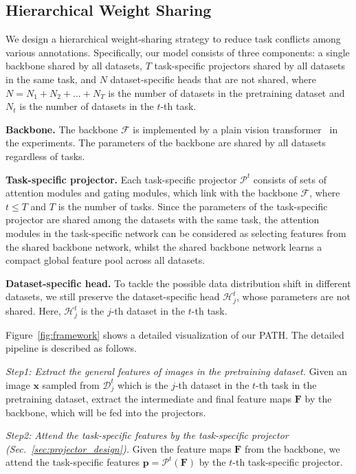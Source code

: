 \documentclass[10pt,twocolumn,letterpaper]{article}
\begin{document}
\subsection{Hierarchical Weight Sharing} \label{sec:hierarchical_weight_sharing}
We design a hierarchical weight-sharing strategy to reduce task conflicts among various annotations. Specifically, our model consists of three components: a single backbone shared by all datasets, $T$ task-specific projectors shared by all datasets in the same task, and $N$ dataset-specific heads that are not shared, where $N=N_1\!+\!N_2\!+\!...\!+\!N_T$ is the number of datasets in the pretraining dataset and $N_t$ is the number of datasets in the $t$-th task. 

\noindent \textbf{Backbone.}
The backbone $\mathcal{F}$ is implemented by a plain vision transformer~\cite{dosovitskiy2020image} in the experiments. The parameters of the backbone are shared by all datasets regardless of tasks. 

\noindent \textbf{Task-specific projector.}
Each task-specific projector $\mathcal{P}^t$ consists of sets of attention modules and gating modules, which link with the backbone $\mathcal{F}$, where $t \le T$ and $T$ is the number of tasks. Since the parameters of the task-specific projector are shared among the datasets with the same task, the attention modules in the task-specific network can be considered as selecting features from the shared backbone network, whilst the shared backbone network learns a compact global feature pool across all datasets. 

\noindent \textbf{Dataset-specific head.} To tackle the possible data distribution shift in different datasets, we still preserve the dataset-specific head $\mathcal{H}^t_j$, whose parameters are not shared. Here, $\mathcal{H}^t_j$ is the $j$-th dataset in the $t$-th task.





Figure~\ref{fig:framework} shows a detailed visualization of our PATH. The detailed pipeline is described as follows.

\emph{Step1: Extract the general features of images in the pretraining dataset.} Given an image $\mathbf{x}$ sampled from $\mathcal{D}^t_{j}$ which is the $j$-th dataset in the $t$-th task in the pretraining dataset, extract the intermediate and final feature maps $\mathbf{F}$ by the backbone, which will be fed into the projectors. 

\emph{Step2:} \emph{Attend the task-specific features by the task-specific projector (Sec.~\ref{sec:projector_design}).} Given the feature maps $\mathbf{F}$ from the backbone, we attend the task-specific features $\mathbf{p}=\mathcal{P}^t(\mathbf{F})$ by the $t$-th task-specific projector.
\end{document}
